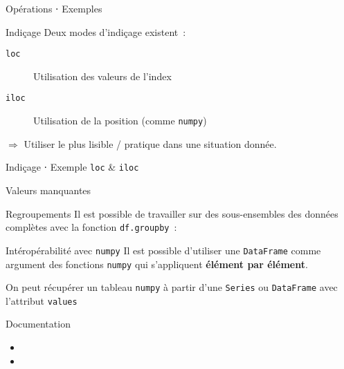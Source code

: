 \begin{frame}{Opérations ⋅ Exemples}
\end{frame}

\begin{frame}{Indiçage}
  Deux modes d'indiçage existent~:
  \begin{description}
    \item[\texttt{loc}] Utilisation des valeurs de l'index
    \item[\texttt{iloc}] Utilisation de la position (comme \texttt{numpy})
  \end{description}
  $\Rightarrow$ Utiliser le plus lisible / pratique dans une situation donnée.
\end{frame}

\begin{frame}{Indiçage ⋅ Exemple \texttt{loc} \& \texttt{iloc}}
\end{frame}

\begin{frame}{Valeurs manquantes}
\end{frame}

\begin{frame}{Regroupements}
  Il est possible de travailler sur des sous-ensembles des données complètes avec la fonction \texttt{df.groupby}~:
\end{frame}

\begin{frame}{Intéropérabilité avec \texttt{numpy}}
  Il est possible d'utiliser une \texttt{DataFrame} comme argument des fonctions \texttt{numpy} qui s'appliquent \textbf{élément par élément}.

  On peut récupérer un tableau \texttt{numpy} à partir d'une \texttt{Series} ou \texttt{DataFrame} avec l'attribut \texttt{values}

\end{frame}

\begin{frame}{Documentation}
  \begin{itemize}
    \item {}
    \item {}
  \end{itemize}
\end{frame}
